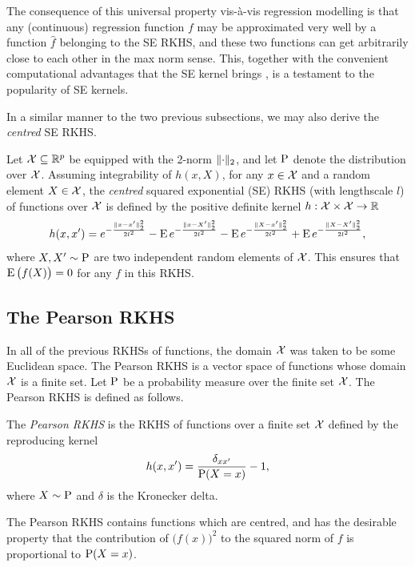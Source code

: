The consequence of this universal property vis-à-vis regression modelling is that any (continuous) regression function $f$ may be approximated very well by a function $\hat f$ belonging to the SE RKHS, and these two functions can get arbitrarily close to each other in the max norm sense.
This, together with the convenient computational advantages that the SE kernel brings \citep{raykar2007fast}, is a testament to the popularity of SE kernels.

In a similar manner to the two previous subsections, we may also derive the \emph{centred} SE RKHS. 

\begin{definition}
  Let ${\mathcal X} \subseteq \mathbb{R}^p$ be equipped with the 2-norm $\lVert\cdot\rVert_2$, and let $\operatorname{P}$ denote the distribution over ${\mathcal X}$.
  Assuming integrability of $h(x,X)$, for any $x\in{\mathcal X}$ and a random element $X\in{\mathcal X}$, the \emph{centred} squared exponential (SE) RKHS (with lengthscale $l$) of functions over ${\mathcal X}$ is defined by the positive definite kernel $h:{\mathcal X}\times{\mathcal X}\to\mathbb{R}$ 
  \[
    h(x,x') = e^{-\frac{\lVert x-x'\rVert_2^2}{2l^2}} 
    - \operatorname{E}  e^{-\frac{\lVert x-X'\rVert_2^2}{2l^2}} 
    - \operatorname{E}  e^{-\frac{\lVert X-x'\rVert_2^2}{2l^2}} 
    + \operatorname{E}  e^{-\frac{\lVert X-X'\rVert_2^2}{2l^2}} ,
  \]
  where $X,X'\sim\operatorname{P}$ are two independent random elements of ${\mathcal X}$. 
  This ensures that $\operatorname{E} \big( f(X) \big) = 0$ for any $f$ in this RKHS.
\end{definition}

\subsection{The Pearson RKHS}

In all of the previous RKHSs of functions, the domain ${\mathcal X}$ was taken to be some Euclidean space. 
The Pearson RKHS is a vector space of functions whose domain ${\mathcal X}$ is a finite set.
Let $\operatorname{P}$ be a probability measure over the finite set ${\mathcal X}$. 
The Pearson RKHS is defined as follows.

\begin{definition}\label{def:pearson}
  The \emph{Pearson RKHS} is the RKHS of functions over a finite set ${\mathcal X}$ defined by the reproducing kernel
  \[
    h(x,x') = \frac{\delta_{xx'}}{\operatorname{P}(X=x)} - 1,
  \]
  where $X \sim \operatorname{P}$ and $\delta$ is the Kronecker delta.
\end{definition}

The Pearson RKHS contains functions which are centred, and has the desirable property that the contribution of $\big( f(x) \big)^2$ to the squared norm of $f$ is proportional to $\operatorname{P}(X=x)$.


